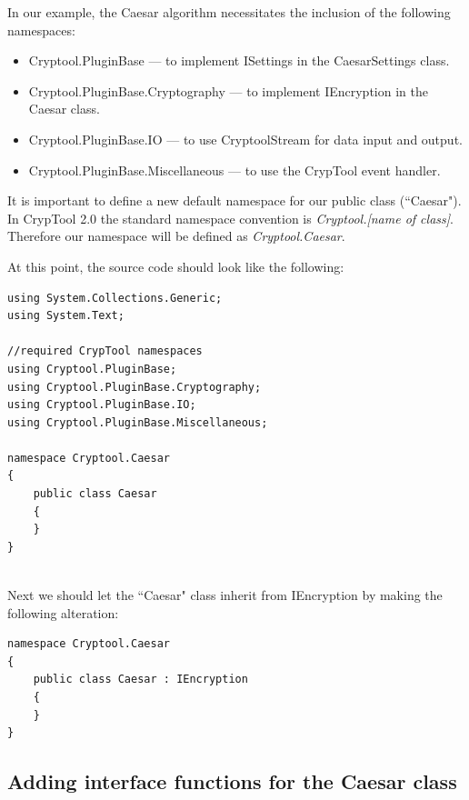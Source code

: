 \noindent In our example, the Caesar algorithm necessitates the inclusion of the following namespaces:

\begin{itemize}
	\item Cryptool.PluginBase --- to implement ISettings in the CaesarSettings class.
	\item Cryptool.PluginBase.Cryptography --- to implement IEncryption in the Caesar class.
	\item Cryptool.PluginBase.IO --- to use CryptoolStream for data input and output.
	\item Cryptool.PluginBase.Miscellaneous --- to use the CrypTool event handler.
\end{itemize}

\noindent It is important to define a new default namespace for our public class (``Caesar"). In CrypTool 2.0  the standard namespace convention is \textit{Cryptool.[name of class]}. Therefore our namespace will be defined as \textit{Cryptool.Caesar}.\clearpage

\noindent At this point, the source code should look like the following:

\begin{lstlisting}
using System.Collections.Generic;
using System.Text;

//required CrypTool namespaces
using Cryptool.PluginBase;
using Cryptool.PluginBase.Cryptography;
using Cryptool.PluginBase.IO;
using Cryptool.PluginBase.Miscellaneous;

namespace Cryptool.Caesar
{
	public class Caesar
	{
	}
}
\end{lstlisting}

\ \\ %
\noindent Next we should let the ``Caesar" class inherit from IEncryption by making the following alteration:

\begin{lstlisting}
namespace Cryptool.Caesar
{
	public class Caesar : IEncryption
	{
	}
}
\end{lstlisting}

\subsection{Adding interface functions for the Caesar class}
\label{sec:AddingInterfaceFunctionsForTheCaesarClass}

